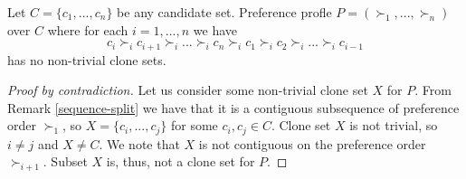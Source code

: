 \begin{lmm} \label{lmmnotrivial}
        Let $C = \{c_1, ..., c_n\}$ be any candidate set.
	Preference profle $P = (\succ_1, ... , \succ_n)$ over $C$
	where for each $i=1,...,n$ we have
	$$c_i \succ_i c_{i+1} \succ_i ... \succ_i c_n \succ_i c_1 \succ_i c_2 \succ_i ... \succ_i c_{i-1}$$
	has no non-trivial clone sets.
\end{lmm}

\begin{proof}[Proof by contradiction]
Let us consider some non-trivial clone set $X$ for $P$.
From Remark \ref{sequence-split} we have that it is a contiguous subsequence of preference order $\succ_1$,
so $X = \{c_i, ..., c_j\}$ for some $c_i, c_j \in C$.
Clone set $X$ is not trivial, so $i\neq{j}$ and $X\neq{C}$.
We note that $X$ is not contiguous on the preference order $\succ_{i+1}$.
Subset $X$ is, thus, not a clone set for $P$.
\end{proof}

